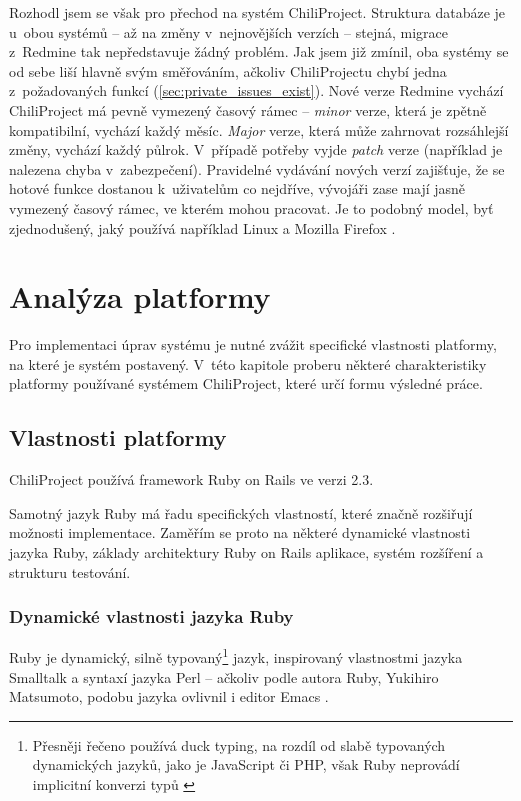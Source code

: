 \documentclass[thesis=B,czech]{FITthesis}[2012/05/02]
\begin{document}
Rozhodl jsem se však pro přechod na systém ChiliProject. Struktura databáze
je u~obou systémů -- až na změny v~nejnovějších verzích -- stejná,
migrace z~Redmine tak nepředstavuje žádný problém. Jak jsem již zmínil,
oba systémy se od sebe liší hlavně svým směřováním, ačkoliv
ChiliProjectu chybí jedna z~požadovaných funkcí
(\autoref{sec:private_issues_exist}). Nové verze Redmine vychází
 ChiliProject má pevně vymezený časový rámec
-- \emph{minor} verze, která je zpětně kompatibilní,
vychází každý měsíc. \emph{Major} verze, která může zahrnovat rozsáhlejší změny,
vychází každý půlrok. V~případě potřeby vyjde \emph{patch} verze (například je nalezena chyba v~zabezpečení).
Pravidelné vydávání nových verzí zajišťuje, že se hotové funkce dostanou
k~uživatelům co nejdříve, vývojáři zase mají jasně vymezený časový
rámec, ve kterém mohou pracovat. Je to podobný model, byť zjednodušený,
jaký používá například Linux a Mozilla Firefox
\citep{MozillaDevProcess}.

\chapter{Analýza platformy}
\label{chap:analyza_navrh}

Pro implementaci úprav systému je nutné zvážit specifické vlastnosti
platformy, na které je systém postavený. V~této kapitole proberu některé
charakteristiky platformy používané systémem ChiliProject, které určí
formu výsledné práce.

\section{Vlastnosti platformy}

ChiliProject používá framework Ruby on Rails ve verzi 2.3.

Samotný jazyk Ruby má řadu specifických vlastností, které značně
rozšiřují možnosti implementace. Zaměřím se proto na některé dynamické
vlastnosti jazyka Ruby, základy architektury Ruby on Rails aplikace,
systém rozšíření a strukturu testování.

\subsection{Dynamické vlastnosti jazyka Ruby}
\label{sec:vlastnosti-ruby}

Ruby je dynamický, silně typovaný\footnote{Přesněji řečeno používá
  \gls{duck typing}, na rozdíl od slabě typovaných dynamických jazyků,
  jako je JavaScript či PHP, však Ruby neprovádí implicitní konverzi typů
  \citep{Lamontagne2007}} jazyk, inspirovaný vlastnostmi jazyka
Smalltalk a syntaxí jazyka Perl \citep{Stewart2001} -- ačkoliv podle
autora Ruby, Yukihiro  Matsumoto, podobu jazyka ovlivnil i editor
Emacs \citep{Matsumoto2012}.
\end{document}
